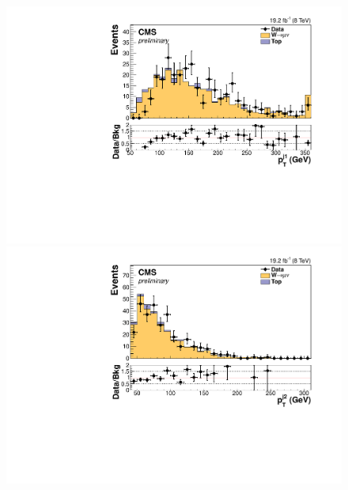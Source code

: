 \begin{figure}
  \includegraphics[width=.65\largefigwidth]{plots/parked/HIG-14-038-figs/output_sigreg/munu_jet1_pt.pdf}
  \includegraphics[width=.65\largefigwidth]{plots/parked/HIG-14-038-figs/output_sigreg/munu_jet2_pt.pdf}


\end{figure}
